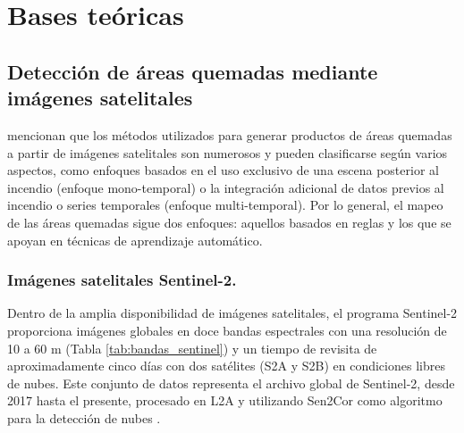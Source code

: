 \section{Bases teóricas}
\subsection{Detección de áreas quemadas mediante imágenes satelitales}
\cite{chuvieco_historical_2019} mencionan que los métodos utilizados para generar productos de áreas quemadas a partir de imágenes 
satelitales son numerosos y pueden clasificarse según varios aspectos, como enfoques basados en el uso 
exclusivo de una escena posterior al incendio (enfoque mono-temporal) o la integración adicional de datos previos al incendio o series temporales 
(enfoque multi-temporal). Por lo general, el mapeo de las áreas quemadas sigue dos enfoques: aquellos basados en reglas y los que se apoyan en técnicas de
aprendizaje automático.

\subsubsection{Imágenes satelitales Sentinel-2.}
Dentro de la amplia disponibilidad de imágenes satelitales, el programa Sentinel-2 proporciona imágenes globales en doce bandas espectrales con una resolución de 10 a 60 m (Tabla \ref{tab:bandas_sentinel}) y un tiempo de revisita de 
aproximadamente cinco días con dos satélites (S2A y S2B) en condiciones libres de nubes.
Este conjunto de datos representa el archivo global de Sentinel-2, desde 2017 hasta el presente, procesado en L2A y utilizando Sen2Cor como algoritmo para la detección de nubes \citep{planetary_2023}.

